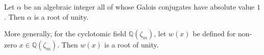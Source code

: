 Let $\alpha$ be an algebraic integer all of whose Galois conjugates have absolute value $1$. Then $\alpha$ is a root of unity.

More generally, for the cyclotomic field $\mathbb{Q}(\zeta_m)$, let $w(x)$ be defined for non-zero $x \in \mathbb{Q}(\zeta_m)$. Then $w(x)$ is a root of unity.

